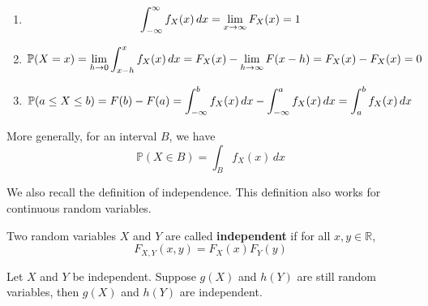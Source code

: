 \documentclass{huhtakm-template-book}
\newcommand{\prob}{\mathbb{P}}
\begin{document}
    \begin{proofing}
        \begin{enumerate}
            \item 
            \begin{equation*}
                \int_{-\infty}^{\infty} f_{X}(x)\,dx=\lim_{x\to\infty}F_{X}(x)=1
            \end{equation*}
            \item
            \begin{equation*}
                \prob(X=x)=\lim_{h\to 0}\intlu{x-h}{x}f_{X}(x)\,dx=F_{X}(x)-\lim_{h\to\infty}F(x-h)=F_{X}(x)-F_{X}(x)=0
            \end{equation*}
            \item
            \begin{equation*}
                \prob(a\leq X\leq b)=F(b)-F(a)=\intlu{-\infty}{b}f_{X}(x)\,dx-\intlu{-\infty}{a}f_{X}(x)\,dx=\intlu{a}{b}f_{X}(x)\,dx
            \end{equation*}
        \end{enumerate}
    \end{proofing}
    \begin{rem}
        More generally, for an interval $B$, we have
        \begin{equation*}
            \prob(X\in B)=\int_{B}f_{X}(x)\,dx
        \end{equation*}
    \end{rem}

    \newpage
    We also recall the definition of independence. This definition also works for continuous random variables.
    \begin{defn}
        Two random variables $X$ and $Y$ are called \textbf{independent} if for all $x,y\in\mathbb{R}$,
        \begin{equation*}
            F_{X,Y}(x,y)=F_{X}(x)F_{Y}(y)
        \end{equation*}
    \end{defn}
    \begin{thm}
        Let $X$ and $Y$ be independent. Suppose $g(X)$ and $h(Y)$ are still random variables, then $g(X)$ and $h(Y)$ are independent.
    \end{thm}
\end{document}
